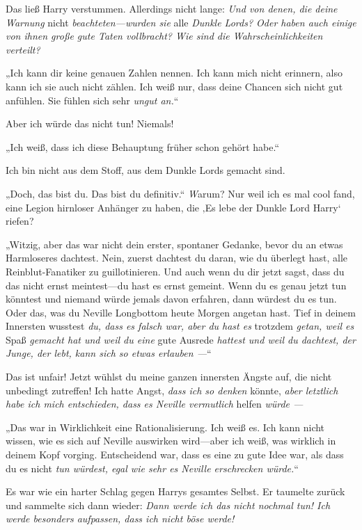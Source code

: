{Das ließ Harry verstummen. Allerdings nicht lange: \emph{Und von denen, die deine Warnung} nicht \emph{beachteten—wurden sie} alle \emph{Dunkle Lords? Oder haben auch einige von ihnen große gute Taten vollbracht? Wie sind die Wahrscheinlichkeiten verteilt?}

„Ich kann dir keine genauen Zahlen nennen. Ich kann mich nicht erinnern, also kann ich sie auch nicht zählen. Ich weiß nur, dass deine Chancen sich nicht gut anfühlen. Sie fühlen sich sehr \emph{ungut an.}“

Aber ich würde das nicht tun! Niemals!

„Ich weiß, dass ich diese Behauptung früher schon gehört habe.“

Ich bin nicht aus dem Stoff, aus dem Dunkle Lords gemacht sind.

„Doch, das bist du. Das bist du definitiv.“ \emph

Warum? Nur weil ich es mal cool fand, eine Legion hirnloser Anhänger zu haben, die ‚Es lebe der Dunkle Lord Harry` riefen?

„Witzig, aber das war nicht dein erster, spontaner Gedanke, bevor du an etwas Harmloseres dachtest. Nein, zuerst dachtest du daran, wie du überlegt hast, alle Reinblut-Fanatiker zu guillotinieren. Und auch wenn du dir jetzt sagst, dass du das nicht ernst meintest—du hast es ernst gemeint. Wenn du es genau jetzt tun könntest und niemand würde jemals davon erfahren, dann würdest du es tun. Oder das, was du Neville Longbottom heute Morgen angetan hast. Tief in deinem Innersten wusstest \emph{du, dass es falsch war, aber du hast es} trotzdem \emph{getan, weil es} Spaß \emph{gemacht hat und weil du eine} gute Ausrede \emph{hattest und weil du dachtest, der Junge, der lebt, kann sich so etwas erlauben —}“

Das ist unfair! Jetzt wühlst du meine ganzen innersten Ängste auf, die nicht unbedingt zutreffen! Ich hatte Angst, \emph{dass ich so denken} könnte, \emph{aber letztlich habe ich mich entschieden, dass es Neville vermutlich} helfen \emph{würde —}

„Das war in Wirklichkeit eine Rationalisierung. Ich weiß es. Ich kann nicht wissen, wie es sich auf Neville auswirken wird—aber ich weiß, was wirklich in deinem Kopf vorging. Entscheidend war, dass es eine zu gute Idee war, als dass du es nicht \emph{tun würdest, egal wie sehr es Neville erschrecken würde.}“

Es war wie ein harter Schlag gegen Harrys gesamtes Selbst. Er taumelte zurück und sammelte sich dann wieder: \emph{Dann werde ich das nicht nochmal tun! Ich werde besonders aufpassen, dass ich nicht böse werde!}

}
